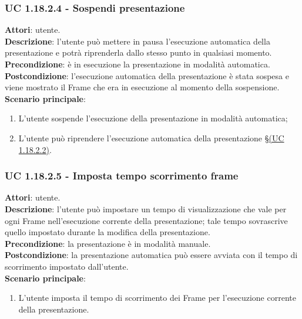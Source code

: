 	\subsubsection{UC 1.18.2.4 - Sospendi presentazione}{
		\label{uc1.18.2.4}
		\textbf{Attori}: utente. \\
		\textbf{Descrizione}: l'utente può mettere in pausa l'esecuzione automatica della presentazione e potrà riprenderla dallo stesso punto in qualsiasi momento. \\
		\textbf{Precondizione}: è in esecuzione la presentazione in modalità automatica.	\\
		\textbf{Postcondizione}: l'esecuzione automatica della presentazione è stata sospesa e viene mostrato il Frame che era in esecuzione al momento della sospensione.\\
		\textbf{Scenario principale}:
		\begin{enumerate}
			\item L'utente sospende l'esecuzione della presentazione in modalità automatica;
			\item L'utente può riprendere l'esecuzione automatica della presentazione \S\hyperref[uc1.18.2.2]{(UC 1.18.2.2)}.
		\end{enumerate}		
	}
	\subsubsection{UC 1.18.2.5 - Imposta tempo scorrimento frame}{
		\label{uc1.18.2.5}
		\textbf{Attori}: utente. \\
		\textbf{Descrizione}: l'utente può impostare un tempo di visualizzazione che vale per ogni Frame nell'esecuzione corrente della presentazione; tale tempo sovrascrive quello impostato durante la modifica della presentazione. \\
		\textbf{Precondizione}: la presentazione è in modalità manuale.	\\
		\textbf{Postcondizione}: la presentazione automatica può essere avviata con il tempo di scorrimento impostato dall'utente.\\
		\textbf{Scenario principale}:
		\begin{enumerate}
			\item L'utente imposta il tempo di scorrimento dei Frame per l'esecuzione corrente della presentazione.
		\end{enumerate}		}
